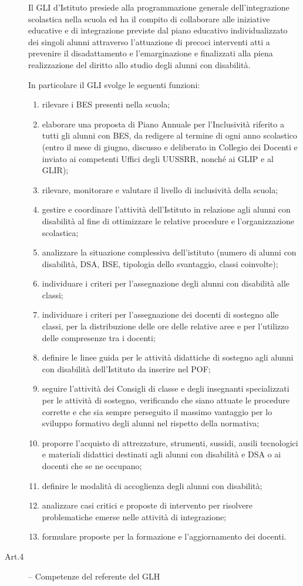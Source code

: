 \begin{description}
	Il GLI d'Istituto presiede alla programmazione generale dell'integrazione scolastica nella scuola ed
	ha il compito di collaborare alle iniziative educative e di integrazione previste dal piano educativo
	individualizzato dei singoli alunni attraverso l'attuazione di precoci interventi atti a prevenire il
	disadattamento e l'emarginazione e finalizzati alla piena realizzazione del diritto allo studio degli
	alunni con disabilità.
	
	In particolare il GLI svolge le seguenti funzioni:
	\begin{enumerate}
		\item rilevare i BES presenti nella scuola;
		\item elaborare una proposta di Piano Annuale per l'Inclusività riferito a tutti gli alunni con BES,
		da redigere al termine di ogni anno scolastico (entro il mese di giugno, discusso e deliberato
		in Collegio dei Docenti e inviato ai competenti Uffici degli UUSSRR, nonché ai GLIP e al
		GLIR);
		\item rilevare, monitorare e valutare il livello di inclusività della scuola;
		\item gestire e coordinare l'attività dell'Istituto in relazione agli alunni con disabilità al fine di
		ottimizzare le relative procedure e l'organizzazione scolastica;
		\item  analizzare la situazione complessiva dell'istituto (numero di alunni con disabilità, DSA,
		BSE, tipologia dello svantaggio, classi coinvolte);
		\item individuare i criteri per l'assegnazione degli alunni con disabilità alle classi;
		\item individuare i criteri per l'assegnazione dei docenti di sostegno alle classi, per la
		distribuzione delle ore delle relative aree e per l'utilizzo delle compresenze tra i docenti;
		\item definire le linee guida per le attività didattiche di sostegno agli alunni con disabilità
		dell'Istituto da inserire nel POF;
		\item seguire l'attività dei Consigli di classe e degli insegnanti specializzati per le attività di
		sostegno, verificando che siano attuate le procedure corrette e che sia sempre perseguito il
		massimo vantaggio per lo sviluppo formativo degli alunni nel rispetto della normativa;
		\item proporre l’acquisto di attrezzature, strumenti, sussidi, ausili tecnologici e materiali didattici
		destinati agli alunni con disabilità e DSA o ai docenti che se ne occupano;
		\item definire le modalità di accoglienza degli alunni con disabilità;
		\item analizzare casi critici e proposte di intervento per risolvere problematiche emerse nelle
		attività di integrazione;
		\item formulare proposte per la formazione e l'aggiornamento dei docenti.
	\end{enumerate}
	\item [Art.4] -- Competenze del referente del GLH
	

\end{description}
